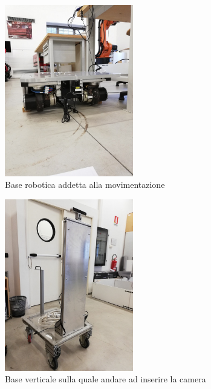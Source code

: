 \begin{figure}
	\centering
	\includegraphics[width=0.5\textwidth]{Immagini/BaseRobotica.jpg}
	\caption{Base robotica addetta alla movimentazione}
	\label{fig:BaseRobotica}
\end{figure}

\begin{figure}
	\centering
	\includegraphics[width=0.5\textwidth]{Immagini/SupportoCamera.jpg}
	\caption{Base verticale sulla quale andare ad inserire la camera}
	\label{fig:SupportoRialzato}
\end{figure}
